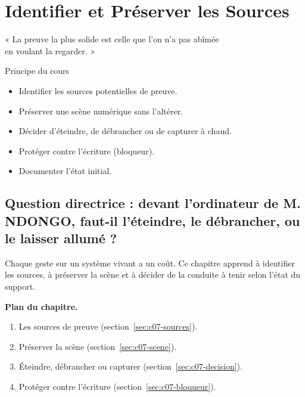 
\chapter{Identifier et Préserver les Sources}
\label{chap:preserver}

\epigraph{%
    « La preuve la plus solide est celle que l'on n'a pas abîmée\\
    en voulant la regarder. »%
}{Principe du cours}


\begin{boxobjectifs}
\begin{itemize}
    \item Identifier les sources potentielles de preuve.
    \item Préserver une scène numérique sans l'altérer.
    \item Décider d'éteindre, de débrancher ou de capturer à chaud.
    \item Protéger contre l'écriture (bloqueur).
    \item Documenter l'état initial.
\end{itemize}
\end{boxobjectifs}

\bigskip

\section*{Question directrice : devant l'ordinateur de M. NDONGO, faut-il l'éteindre, le débrancher, ou le laisser allumé ?}

Chaque geste sur un système vivant a un coût. Ce chapitre apprend à
identifier les sources, à préserver la scène et à décider de la conduite à
tenir selon l'état du support.

\medskip
\textbf{Plan du chapitre.}
\begin{enumerate}
    \item Les sources de preuve (section~\ref{sec:c07-sources}).
    \item Préserver la scène (section~\ref{sec:c07-scene}).
    \item Éteindre, débrancher ou capturer (section~\ref{sec:c07-decision}).
    \item Protéger contre l'écriture (section~\ref{sec:c07-bloqueur}).
\end{enumerate}

